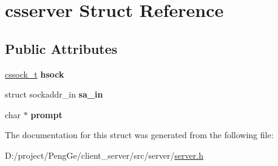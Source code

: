 \hypertarget{structcsserver}{}\section{csserver Struct Reference}
\label{structcsserver}
\subsection*{Public Attributes}
\begin{DoxyCompactItemize}
\item 
\hypertarget{structcsserver_a85d00fe1d4afb6628c32544533a982d9}{}\hyperlink{sock__types_8h_aff065565f761db4433fff15fc7b7c471}{cssock\+\_\+t} {\bfseries hsock}\label{structcsserver_a85d00fe1d4afb6628c32544533a982d9}

\item 
\hypertarget{structcsserver_a0bafc662541f5a0772341a60e109f99b}{}struct sockaddr\+\_\+in {\bfseries sa\+\_\+in}\label{structcsserver_a0bafc662541f5a0772341a60e109f99b}

\item 
\hypertarget{structcsserver_a9f9d1438336232441c95191ea11c3b5c}{}char $\ast$ {\bfseries prompt}\label{structcsserver_a9f9d1438336232441c95191ea11c3b5c}

\end{DoxyCompactItemize}


The documentation for this struct was generated from the following file\+:\begin{DoxyCompactItemize}
\item 
D\+:/project/\+Peng\+Ge/client\+\_\+server/src/server/\hyperlink{server_8h}{server.\+h}\end{DoxyCompactItemize}
